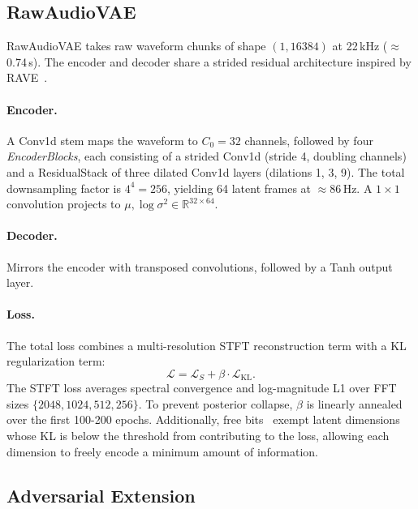 \documentclass[10pt, twocolumn]{article}
\begin{document}
\subsection{RawAudioVAE}

RawAudioVAE takes raw waveform chunks of shape $(1, 16384)$ at
22\,kHz ($\approx$0.74\,s).
The encoder and decoder share a strided residual architecture
inspired by RAVE~\cite{caillon2021ravevariationalautoencoderfast}.

\paragraph{Encoder.}
A Conv1d stem maps the waveform to $C_0 = 32$ channels, followed by
four \textit{EncoderBlocks}, each consisting of a strided Conv1d
(stride 4, doubling channels) and a ResidualStack of three dilated
Conv1d layers (dilations 1, 3, 9).
The total downsampling factor is $4^4 = 256$, yielding 64 latent frames
at $\approx$86\,Hz.
A $1{\times}1$ convolution projects to $\mu, \log\sigma^2 \in \mathbb{R}^{32 \times 64}$.

\paragraph{Decoder.}
Mirrors the encoder with transposed convolutions, followed by a Tanh
output layer.

\paragraph{Loss.}
The total loss combines a multi-resolution STFT reconstruction term with a KL regularization term:
\begin{equation}
    \mathcal{L} = \mathcal{L}_S + \beta \cdot \mathcal{L}_{\text{KL}}.
    \label{eq:loss}
\end{equation}
The STFT loss averages spectral convergence and log-magnitude L1 over FFT sizes $\{2048, 1024, 512, 256\}$.
To prevent posterior collapse, $\beta$ is linearly annealed over the first 100-200 epochs.
Additionally, free bits~\cite{kingma2017improvingvariationalinferenceinverse} exempt latent dimensions
whose KL is below the threshold from contributing to the loss,
allowing each dimension to freely encode a minimum amount of information.

\subsection{Adversarial Extension}
\end{document}

